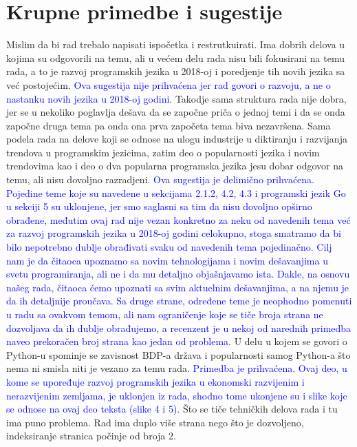 \documentclass[a4paper]{report}
\newcommand{\odgovor}[1]{\textcolor{blue}{#1}}
\begin{document}
\section{Krupne primedbe i sugestije}
Mislim da bi rad trebalo napisati ispočetka i restrutkuirati. Ima dobrih delova u kojima su odgovorili na temu, ali u većem delu rada nisu bili fokusirani na temu rada, a to je razvoj programskih jezika u 2018-oj i poredjenje tih novih jezika sa već postojećim.
\odgovor{Ova sugestija nije prihvaćena jer rad govori o razvoju, a ne o nastanku novih jezika u 2018-oj godini.}
Takodje sama struktura rada nije dobra, jer se u nekoliko poglavlja dešava da se započne priča o jednoj temi i da se onda započne druga tema pa onda ona prva započeta tema biva nezavršena. Sama podela rada na delove koji se odnose na ulogu industrije u diktiranju i razvijanja trendova u programskim jezicima,  zatim deo o popularnosti jezika i novim trendovima kao i deo o dva popularna programska jezika jesu dobar odgovor na temu, ali nisu dovoljno razradjeni.
\odgovor{Ova sugestija je delimično prihvaćena. Pojedine teme koje su navedene u sekcijama 2.1.2, 4.2, 4.3 i programski jezik Go u sekciji 5 su uklonjene, jer smo saglasni sa tim da nisu dovoljno opširno obrađene, međutim ovaj rad nije vezan konkretno za neku od navedenih tema već za razvoj programskih jezika u 2018-oj godini celokupno, stoga smatramo da bi bilo nepotrebno dublje obrađivati svaku od navedenih tema pojedinačno. Cilj nam je da čitaoca upoznamo sa novim tehnologijama i novim dešavanjima u svetu programiranja, ali ne i da mu detaljno objašnjavamo ista. Dakle, na osnovu našeg rada, čitaoca ćemo upoznati sa svim aktuelnim dešavanjima, a na njemu je da ih detaljnije proučava. Sa druge strane, određene teme je neophodno pomenuti u radu sa ovakvom temom, ali nam ograničenje koje se tiče broja strana ne dozvoljava da ih dublje obrađujemo, a recenzent je u nekoj od narednih primedba naveo prekoračen broj strana kao jedan od problema. }
U delu u kojem se govori o Python-u spominje se zavisnost BDP-a država i popularnosti samog Python-a što nema ni smisla niti je vezano za temu rada. 
\odgovor{Primedba je prihvaćena. Ovaj deo, u kome se upoređuje razvoj programskih jezika u ekonomski razvijenim i nerazvijenim zemljama, je uklonjen iz rada, shodno tome ukonjene su i slike koje se odnose na ovaj deo teksta (slike 4 i 5).}
Što se tiče tehničkih delova rada i tu ima puno problema. Rad ima duplo više strana nego što je dozvoljeno, indeksiranje stranica počinje od broja 2.
\end{document}
